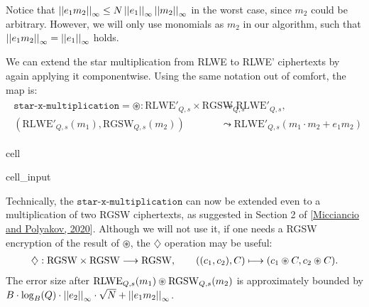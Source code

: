 \documentclass[letterpaper,10pt,english]{jupyterBook}
\begin{document}
\sphinxAtStartPar
Notice that \(\left\lvert\left\lvert e_1m_2 \right\rvert\right\rvert_\infty \le N \left\lvert\left\lvert e_1 \right\rvert\right\rvert_\infty\left\lvert\left\lvert m_2 \right\rvert\right\rvert_\infty\) in the worst case, since \(m_2\) could be arbitrary.
However, we will only use monomials as \(m_2\) in our algorithm, such that \(\left\lvert\left\lvert e_1m_2 \right\rvert\right\rvert_\infty = \left\lvert\left\lvert e_1 \right\rvert\right\rvert_\infty\) holds.

\sphinxAtStartPar
We can extend the star multiplication from RLWE to RLWE’ ciphertexts by again applying it component\sphinxhyphen{}wise.
Using the same notation out of comfort, the map is:
\begin{equation*}
\begin{split}\begin{split}
\texttt{star-x-multiplication} = \circledast: \mathrm{RLWE'}_{Q,s} \times \mathrm{RGSW}_{Q,s} &\longrightarrow \mathrm{RLWE'}_{Q,s}, \\ (\mathrm{RLWE'}_{Q,s}(m_1), \mathrm{RGSW}_{Q,s}(m_2)) &\leadsto \mathrm{RLWE'}_{Q,s}(m_1\cdot m_2+e_1m_2)
\end{split}\end{split}
\end{equation*}
\begin{sphinxuseclass}{cell}\begin{sphinxVerbatimInput}

\begin{sphinxuseclass}{cell_input}
\begin{sphinxVerbatim}[commandchars=\\\{\}]
    
     \PYG{p}{[}\PYG{p}{[}\PYG{p}{]}       \PYG{p}{]}
\end{sphinxVerbatim}

\end{sphinxuseclass}\end{sphinxVerbatimInput}

\end{sphinxuseclass}
\sphinxAtStartPar
Technically, the \(\texttt{star-x-multiplication}\) can now be extended even to a multiplication of two RGSW ciphertexts, as suggested in Section 2 of {[}\hyperlink{cite.Thesis:id74}{Micciancio and Polyakov, 2020}{]}.
Although we will not use it, if one needs a RGSW encryption of the result of \(\circledast\), the \(\diamondsuit\) operation may be useful:
\begin{equation*}
\begin{split}\diamondsuit: \mathrm{RGSW} \times \mathrm{RGSW} \longrightarrow \mathrm{RGSW}, \qquad ((c_1,c_2),C) \longmapsto (c_1 \circledast C, c_2 \circledast C).\end{split}
\end{equation*}\label{\detokenize{Thesis:automorphisms-of-r}}
\sphinxAtStartPar
The error size after \(\mathrm{RLWE}_{Q,s}(m_1) \circledast \mathrm{RGSW}_{Q,s}(m_2)\) is approximately bounded by \(B \cdot \log_B(Q) \cdot \left\lvert\left\lvert e_2 \right\rvert\right\rvert_\infty \cdot \sqrt{N} + \left\lvert\left\lvert e_1m_2 \right\rvert\right\rvert_\infty\).
\end{document}

